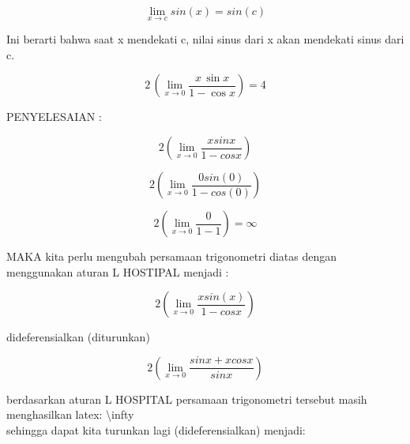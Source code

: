 \documentclass[a4paper,10pt]{article}
\begin{document}
\begin{eulernotebook}
\begin{eulercomment}
\begin{eulercomment}
\begin{eulercomment}
\begin{eulercomment}
\begin{eulercomment}
\begin{eulercomment}
\begin{eulercomment}
\begin{eulercomment}
\begin{eulercomment}
\begin{eulercomment}
\end{eulercomment}
\begin{eulerformula}
\[
\lim_{x \to c} sin(x) = sin(c)
\]
\end{eulerformula}
\begin{eulercomment}
Ini berarti bahwa saat x mendekati c, nilai sinus dari x akan
mendekati sinus dari c.
\end{eulercomment}
\begin{eulerformula}
\[
2\,\left(\lim_{x\rightarrow 0}{\frac{x\,\sin x}{1-\cos x}}\right)=4
\]
\end{eulerformula}
\begin{eulercomment}
PENYELESAIAN :\\
\end{eulercomment}
\begin{eulerformula}
\[
2( \lim \limits_{x \to 0} \frac{xsinx}{1-cosx} )
\]
\end{eulerformula}
\begin{eulerformula}
\[
2( \lim \limits_{x \to 0} \frac{0sin(0)}{1-cos(0)} )
\]
\end{eulerformula}
\begin{eulerformula}
\[
2( \lim \limits_{x \to 0} \frac{0}{1-1} ) = \infty
\]
\end{eulerformula}
\begin{eulercomment}
MAKA kita perlu mengubah persamaan trigonometri diatas dengan
menggunakan aturan L HOSTIPAL menjadi :\\
\end{eulercomment}
\begin{eulerformula}
\[
2( \lim \limits_{x \to 0} \frac{xsin(x)}{1-cosx} )
\]
\end{eulerformula}
\begin{eulercomment}
dideferensialkan (diturunkan)\\
\end{eulercomment}
\begin{eulerformula}
\[
2( \lim \limits_{x \to 0} \frac{sinx + xcosx}{sinx} )
\]
\end{eulerformula}
\begin{eulercomment}
berdasarkan aturan L HOSPITAL persamaan trigonometri tersebut masih
menghasilkan latex: \textbackslash{}infty  \\
sehingga dapat kita turunkan lagi (dideferensialkan) menjadi:


\end{eulercomment}
\end{eulercomment}
\end{eulercomment}
\end{eulercomment}
\end{eulercomment}
\end{eulercomment}
\end{eulercomment}
\end{eulercomment}
\end{eulercomment}
\end{eulercomment}
\end{eulernotebook}
\end{document}
